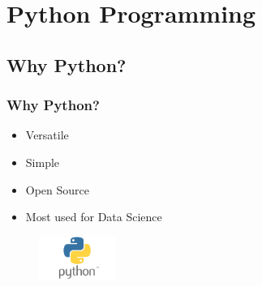 



\begin{frame}
   \titlepage
\end{frame}



\begin{frame}
   \tableofcontents
\end{frame}

\section{Python Programming}


\subsection{Why Python?}
\begin{frame}\frametitle{Why Python?}
   \begin{itemize}
      \item Versatile
      \item Simple
      \item Open Source
      \item Most used for Data Science
   \end{itemize}

   \vspace{1cm}
   \begin{minipage}{0.4\linewidth}
      \begin{figure}[H]
         \includegraphics[width=2.5cm]{../images/illustrations/python_logo.png}
      \end{figure}
   \end{minipage}

\end{frame}


